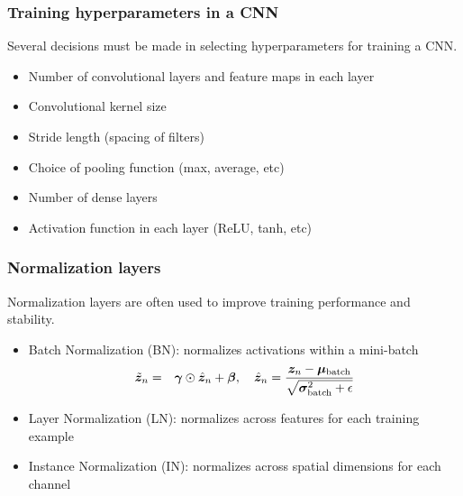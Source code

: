 \documentclass[smaller]{beamer}
\begin{document}
\begin{frame}
  \frametitle{Training hyperparameters in a CNN}
  Several decisions must be made in selecting hyperparameters for training a CNN.

  \begin{itemize}[<+->]
  \item Number of convolutional layers and feature maps in each layer
  \item Convolutional kernel size
  \item Stride length (spacing of filters)
  \item Choice of pooling function (max, average, etc)
  \item Number of dense layers
  \item Activation function in each layer (ReLU, tanh, etc)
  \end{itemize}

 
\end{frame}

\begin{frame}
  \frametitle{Normalization layers}\pause
  Normalization layers are often used to improve training performance and stability. \pause
  \begin{itemize}
    \item Batch Normalization (BN): normalizes activations within a mini-batch
    \begin{eqnarray*}
      \tilde{\bm z}_n &=& \bm\gamma \odot \hat{\bm z}_n + \bm\beta, \quad \hat{\bm z}_n = \frac{\bm z_n - \bm\mu_{\text{batch}}}{\sqrt{\bm\sigma_{\text{batch}}^2 + \epsilon}}
    \end{eqnarray*}
    \item Layer Normalization (LN): normalizes across features for each training example
    \item Instance Normalization (IN): normalizes across spatial dimensions for each channel
  \end{itemize}

  

\end{frame}
\end{document}
